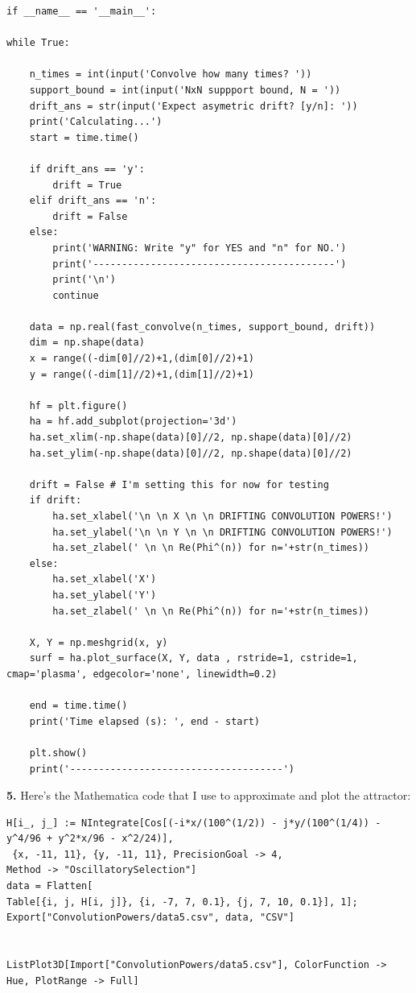 \documentclass{article}
\theoremstyle{definition}
\begin{document}
\begin{lstlisting}
if __name__ == '__main__':

while True:

	n_times = int(input('Convolve how many times? '))
	support_bound = int(input('NxN suppport bound, N = '))
	drift_ans = str(input('Expect asymetric drift? [y/n]: '))
	print('Calculating...')
	start = time.time()

	if drift_ans == 'y':
		drift = True
	elif drift_ans == 'n':
		drift = False
	else:
		print('WARNING: Write "y" for YES and "n" for NO.')
		print('------------------------------------------')
		print('\n')
		continue

	data = np.real(fast_convolve(n_times, support_bound, drift))
	dim = np.shape(data)
	x = range((-dim[0]//2)+1,(dim[0]//2)+1)
	y = range((-dim[1]//2)+1,(dim[1]//2)+1)

	hf = plt.figure()
	ha = hf.add_subplot(projection='3d')
	ha.set_xlim(-np.shape(data)[0]//2, np.shape(data)[0]//2)
	ha.set_ylim(-np.shape(data)[0]//2, np.shape(data)[0]//2)

	drift = False # I'm setting this for now for testing
	if drift:
		ha.set_xlabel('\n \n X \n \n DRIFTING CONVOLUTION POWERS!')
		ha.set_ylabel('\n \n Y \n \n DRIFTING CONVOLUTION POWERS!')
		ha.set_zlabel(' \n \n Re(Phi^(n)) for n='+str(n_times))
	else:
		ha.set_xlabel('X')
		ha.set_ylabel('Y')
		ha.set_zlabel(' \n \n Re(Phi^(n)) for n='+str(n_times))

	X, Y = np.meshgrid(x, y)  
	surf = ha.plot_surface(X, Y, data , rstride=1, cstride=1, cmap='plasma', edgecolor='none', linewidth=0.2)

	end = time.time()
	print('Time elapsed (s): ', end - start)

	plt.show()
	print('-------------------------------------')
\end{lstlisting}



\newpage



\noindent \textbf{5.} Here's the Mathematica code that I use to approximate and plot the attractor:
\begin{lstlisting}
H[i_, j_] := NIntegrate[Cos[(-i*x/(100^(1/2)) - j*y/(100^(1/4)) - y^4/96 + y^2*x/96 - x^2/24)],
 {x, -11, 11}, {y, -11, 11}, PrecisionGoal -> 4, 
Method -> "OscillatorySelection"]
data = Flatten[
Table[{i, j, H[i, j]}, {i, -7, 7, 0.1}, {j, 7, 10, 0.1}], 1];
Export["ConvolutionPowers/data5.csv", data, "CSV"]


ListPlot3D[Import["ConvolutionPowers/data5.csv"], ColorFunction -> Hue, PlotRange -> Full]
\end{lstlisting}
\end{document}

